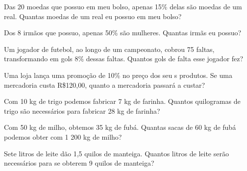 \item Das 20 moedas que possuo em meu bolso, apenas 15\% delas são moedas de um real. Quantas moedas de um real eu possuo em meu bolso? 

\item Dos 8 irmãos que possuo, apenas 50\% são mulheres. Quantas irmãs eu possuo?

\item Um jogador de futebol, ao longo de um campeonato, cobrou 75 faltas, transformando em gols 8\% dessas faltas. Quantos gols de falta esse jogador fez?  

\item Uma loja lança uma promoção de 10\% no preço dos seu s produtos. Se uma mercadoria custa R\$120,00, quanto a mercadoria passará a custar? 

\item Com  10  kg  de  trigo  podemos  fabricar  7 kg  de  farinha.  Quantos  quilogramas  de  trigo  são necessários para fabricar 28 kg de farinha? 

\item Com 50 kg de milho, obtemos 35 kg de fubá. Quantas sacas de 60 kg de fubá podemos obter com 1 200 kg de milho?

\item Sete litros de leite dão 1,5 quilos de manteiga. Quantos litros de leite serão necessários para se obterem 9 quilos de manteiga?
